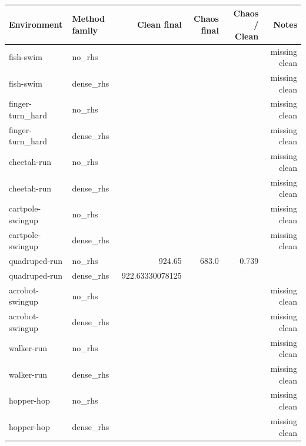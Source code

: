 \begin{tabular}{llrrrr}
\toprule
Environment & Method family & Clean final & Chaos final & Chaos / Clean & Notes \\
\midrule
fish-swim & no\_rhs &  &  &  & missing clean \\
fish-swim & dense\_rhs &  &  &  & missing clean \\
finger-turn\_hard & no\_rhs &  &  &  & missing clean \\
finger-turn\_hard & dense\_rhs &  &  &  & missing clean \\
cheetah-run & no\_rhs &  &  &  & missing clean \\
cheetah-run & dense\_rhs &  &  &  & missing clean \\
cartpole-swingup & no\_rhs &  &  &  & missing clean \\
cartpole-swingup & dense\_rhs &  &  &  & missing clean \\
quadruped-run & no\_rhs & 924.65 & 683.0 & 0.739 &  \\
quadruped-run & dense\_rhs & 922.63330078125 &  &  &  \\
acrobot-swingup & no\_rhs &  &  &  & missing clean \\
acrobot-swingup & dense\_rhs &  &  &  & missing clean \\
walker-run & no\_rhs &  &  &  & missing clean \\
walker-run & dense\_rhs &  &  &  & missing clean \\
hopper-hop & no\_rhs &  &  &  & missing clean \\
hopper-hop & dense\_rhs &  &  &  & missing clean \\
\bottomrule
\end{tabular}
